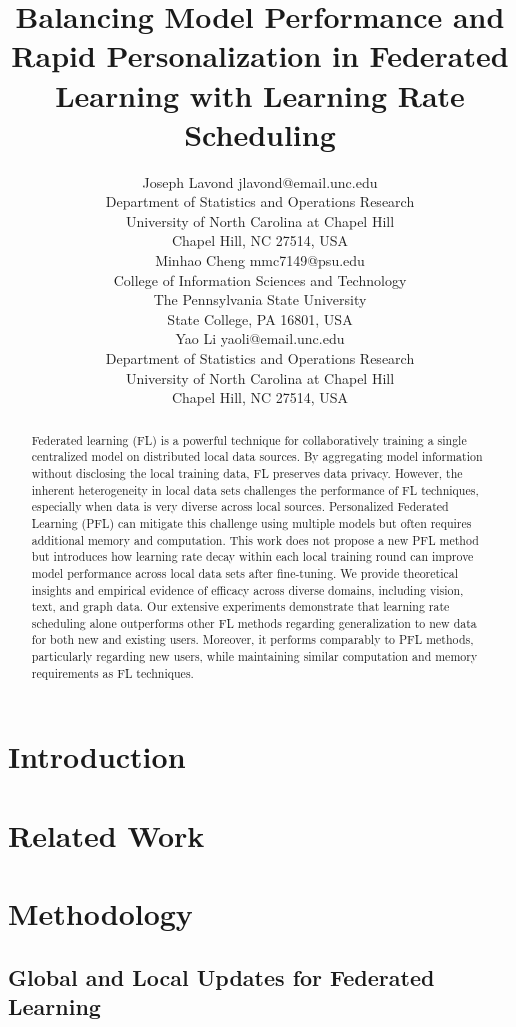 \documentclass[10pt]{article}
\title{
Balancing Model Performance and Rapid Personalization in Federated Learning with Learning Rate Scheduling
}
\author{
    \name Joseph Lavond \email jlavond@email.unc.edu \\
    \addr Department of Statistics and Operations Research \\
        University of North Carolina at Chapel Hill \\
        Chapel Hill, NC 27514, USA \\
    \AND
    \name Minhao Cheng \email mmc7149@psu.edu \\
    \addr College of Information Sciences and Technology \\
        The Pennsylvania State University \\
        State College, PA 16801, USA \\
    \AND
    \name Yao Li \email yaoli@email.unc.edu \\
    \addr Department of Statistics and Operations Research \\
        University of North Carolina at Chapel Hill \\
        Chapel Hill, NC 27514, USA \\
}
\begin{document}
    \maketitle
    
    \begin{abstract}%
        Federated learning (FL) is a powerful technique for collaboratively training a single centralized model on distributed local data sources.  By aggregating model information without disclosing the local training data, FL preserves data privacy. However, the inherent heterogeneity in local data sets challenges the performance of FL techniques, especially when data is very diverse across local sources. Personalized Federated Learning (PFL) can mitigate this challenge using multiple models but often requires additional memory and computation. This work does not propose a new PFL method but introduces how learning rate decay within each local training round can improve model performance across local data sets after fine-tuning. We provide theoretical insights and empirical evidence of efficacy across diverse domains, including vision, text, and graph data. Our extensive experiments demonstrate that learning rate scheduling alone outperforms other FL methods regarding generalization to new data for both new and existing users. Moreover, it performs comparably to PFL methods, particularly regarding new users, while maintaining similar computation and memory requirements as FL techniques.
    \end{abstract}
    
    \section{Introduction}
    \label{sec: decay-intro}
    
    
    \section{Related Work}
    \label{sec: decay-related}
    

    \section{Methodology}
    \label{sec: decay-method}
    

        \subsection{Global and Local Updates for Federated Learning}
        \label{sec: decay-method-updates}
        
        
\end{document}
